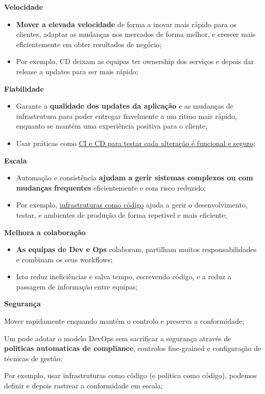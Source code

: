 \documentclass{article}
\begin{document}
\begin{flushleft}
  \textbf{Velocidade}
  \begin{itemize}
    \item \textbf{Mover a elevada velocidade} de forma a inovar mais rápido
    para os clientes, adaptar as mudanças nos mercados de forma melhor, e
    crescer mais eficientemente em obter resultados de negócio;
    \item Por exemplo, CD deixam as equipas ter ownership
    dos serviços e depois dar release a updates para ser mais rápido;
  \end{itemize}

  \textbf{Fiabilidade}
  \begin{itemize}
    \item Garante a \textbf{qualidade dos updates da aplicação}
    e as mudanças de infrastrutura para poder entregar fiavelmente
    a um ritmo mais rápido, enquanto se mantém uma experiência
    positiva para o cliente;
    \item Usar práticas como \uline{CI e CD para testar cada alteração
    é funcional e seguro};
  \end{itemize}

  \textbf{Escala}
  \begin{itemize}
    \item Automação e consistência \textbf{ajudam a gerir sistemas complexos
    ou com mudanças frequentes} eficientemente e com risco reduzido;
    \item Por exemplo, \uline{infrastruturas como código} ajuda a gerir
    o desenvolvimento, testar, e ambientes de produção de forma
    repetivel e mais eficiente;
  \end{itemize}

  \textbf{Melhora a colaboração}
  \begin{itemize}
    \item \textbf{As equipas de Dev e Ops} colaboram,
    partilham muitos responsabilidades e combinam os seus workflows;
    \item Isto reduz ineficiências e salva tempo, escrevendo código,
    e a reduz a passagem de informação entre equipas;
  \end{itemize}

  \textbf{Segurança}
  \item Mover rapidamente enquando mantém o controlo e preserva a conformidade;
  \item Um pode adotar o modelo DevOps sem sacrificar a segurança através de
  \textbf{politicas automaticas de compliance}, controlos fine-grained e
  configuração de técnicas de gestão;
  \item Por exemplo, usar infrastruturas como código (e politica como
  código), podemos definir e depois rastrear a conformidade em escala;
\end{flushleft}
\end{document}
